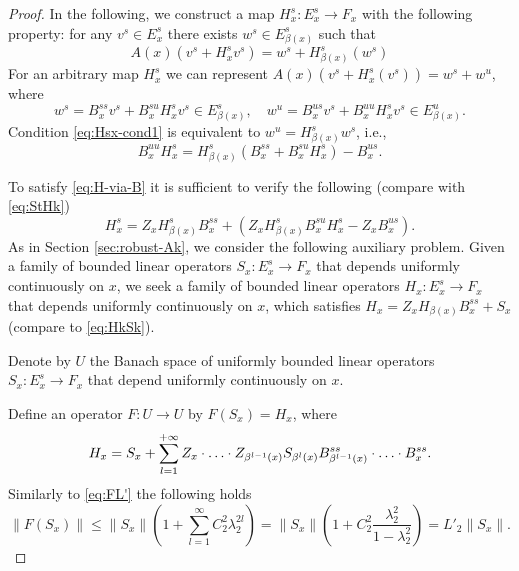 \documentclass[12pt]{article}
\theoremstyle{definition}
\begin{document}
\begin{proof}
In the following, we construct a map $H_x^s:E_x^s \to F_x$ with the following property: for any $v^s \in E^s_x$ there exists $w^s \in E_{\beta(x)}^s$ such that 
\begin{equation}\label{eq:Hsx-cond1}
A(x)(v^s+ H^s_xv^s) = w^s+ H^s_{\beta(x)}(w^s)
\end{equation}
For an arbitrary map $H_x^s$ we can represent $A(x)(v^s+ H^s_x(v^s)) = w^s + w^u$, where 
\begin{equation*}
    w^s = B^{ss}_x v^s + B^{su}_x H^s_xv^s \in E^s_{\beta(x)}, \quad
    w^u = B^{us}_x v^s + B^{uu}_x H^s_xv^s \in E^u_{\beta(x)}.
\end{equation*}
Condition \eqref{eq:Hsx-cond1} is equivalent to $w^u = H^s_{\beta(x)}w^s$, i.e.,
\begin{equation}\label{eq:H-via-B}
B^{uu}_x H^s_x = H_{\beta(x)}^s(B^{ss}_x + B^{su}_xH^s_x) - B^{us}_x.
\end{equation}

To satisfy \eqref{eq:H-via-B} it is sufficient to verify the following (compare with \eqref{eq:StHk})
\begin{equation}\label{eq:H-via-Z}
H_x^s = Z_x H^s_{\beta(x)} B_x^{ss} + (Z_x H^s_{\beta(x)}B^{su}_xH^s_x  - Z_xB^{us}_x).    
\end{equation}
As in Section \ref{sec:robust-Ak}, we consider the following auxiliary problem. Given a family of bounded linear operators $S_x:E^s_x \to F_x$ that depends uniformly continuously on $x$, we seek a family of bounded linear operators $H_x: E^s_x \to F_x$ that depends uniformly continuously on $x$, which satisfies 
$
H_x = Z_xH_{\beta(x)}B_x^{ss} + S_x
$ 
(compare to \eqref{eq:HkSk}).

Denote by $U$ the Banach space of uniformly bounded linear operators $S_x : E^s_x \to F_x$ that depend uniformly continuously on $x$.

Define an operator $F: U \to U$ by $F(S_x) = H_x$, where
\begin{equation}\notag
H_x = S_x + \sum_{l = 1}^{+\infty}Z_x\cdot \ldots \cdot Z_{\beta^{l-1}(x)}S_{\beta^{l}(x)}B_{\beta^{l-1}(x)}^{ss} \cdot \ldots \cdot B_x^{ss}.    
\end{equation}
Similarly to \eqref{eq:FL'} the following holds
\begin{equation}\label{eq:FL'cont}
\|F(S_x)\| \leq \|S_x\| \left(1+ \sum_{l=1}^{\infty} C_2^2\lambda_2^{2l} \right) = \|S_x\|\left(1+ C_2^2 \frac{\lambda_2^2}{1-\lambda_2^2}\right) = L'_2 \|S_x\|.        
\end{equation}


\end{proof}
\end{document}
